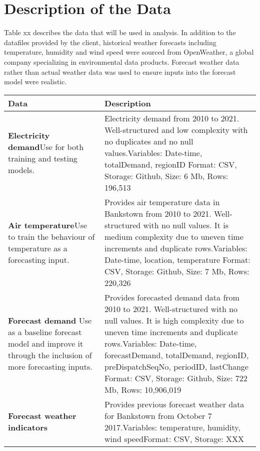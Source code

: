 \documentclass[mstat,12pt,a4paper]{unswthesis}
\begin{document}
\section{Description of the Data}\label{description-of-the-data}

Table xx describes the data that will be used in analysis. In addition
to the datafiles provided by the client, historical weather forecasts
including temperature, humidity and wind speed were sourced from
OpenWeather, a global company specializing in environmental data
products. Forecast weather data rather than actual weather data was used
to ensure inputs into the forecast model were realistic.

\begin{table}[H]
\centering
\begin{tabular}{|p{13em}|p{20em}|}

\hline
\textbf{Data} & \textbf{Description} \\

\hline
\textbf{Electricity demand}\newline Use for both training and testing models. & Electricity demand from 2010 to 2021. Well-structured and low complexity with no duplicates and no null values.\newline Variables: Date-time, totalDemand, regionID\newline
Format: CSV, Storage: Github, Size: 6 Mb, Rows: 196,513 \\

\hline
\textbf{Air temperature}\newline Use to train the behaviour of temperature as a forecasting input. & Provides air temperature data in Bankstown from 2010 to 2021. Well-structured with no null values. It is medium complexity due to uneven time increments and duplicate rows.\newline Variables: Date-time, location, temperature\newline
Format: CSV, Storage: Github, Size: 7 Mb, Rows: 220,326 \\

\hline
\textbf{Forecast demand} \newline Use as a baseline forecast model and improve it through the inclusion of more forecasting inputs. & Provides forecasted demand data from 2010 to 2021. Well-structured with no null values. It is high complexity due to uneven time increments and duplicate rows.\newline Variables: Date-time, forecastDemand, totalDemand, regionID, preDispatchSeqNo, periodID, lastChange\newline
Format: CSV, Storage: Github, Size: 722 Mb, Rows: 10,906,019 \\

\hline
\textbf{Forecast weather indicators} & Provides previous forecast weather data for Bankstown from October 7 2017.\newline Variables: temperature, humidity, wind speed\newline Format: CSV, Storage: XXX \\ 

\hline

\end{tabular}
\end{table}
\end{document}
